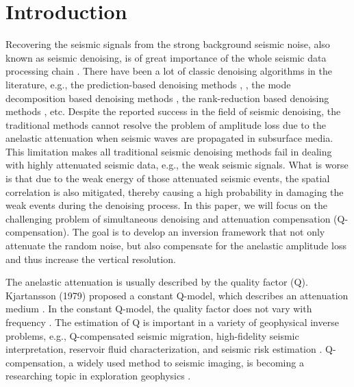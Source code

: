 \section{Introduction}
Recovering the seismic signals from the strong background seismic noise, also known as seismic denoising, is of great importance of the whole seismic data processing chain \cite{yanan2014,yanhui2016,amir2017ieee,li2018multidimensional,wang2019hankel}.  There have been a lot of classic denoising algorithms in the literature, e.g., the prediction-based denoising methods \cite{canales1984,abma1995}, , the mode decomposition based denoising methods \cite{chenwei2012}, the rank-reduction based denoising methods \cite{mssa,weilin2016dmssa,zhaoqiang2019tgrs}, etc. Despite the reported success in the field of seismic denoising, the traditional methods cannot resolve the problem of amplitude loss due to the anelastic attenuation when seismic waves are propagated in subsurface media.  This limitation makes all traditional seismic denoising methods fail in dealing with highly attenuated seismic data, e.g., the weak seismic signals. What is worse is that due to the weak energy of those attenuated seismic events, the spatial correlation is also mitigated, thereby causing a high probability in damaging the weak events during the denoising process.  In this paper, we will focus on the challenging problem of simultaneous denoising and attenuation compensation (Q-compensation). The goal is to develop an inversion framework that not only  attenuate the random noise, but also compensate for the anelastic amplitude loss and thus increase the vertical resolution.  

The anelastic attenuation is usually described by the quality factor (Q). Kjartansson (1979) \cite{kjartansson1979constant} proposed a constant Q-model, which describes an attenuation medium \cite{bickel1985plane,wang2002stable,shen2018q,shen2018q2}. In the constant Q-model, the quality factor does not vary with frequency \cite{braginsky1989quality,dai2012multi}. The estimation of Q is important in a variety of geophysical inverse problems, e.g., Q-compensated seismic migration, high-fidelity seismic interpretation, reservoir fluid characterization, and seismic risk estimation \cite{mousavi2014jgr,shank2018image,cheng2018q,jyothi2017seismic,luo2019q,chen2019multichannel}. Q-compensation, a widely used method to seismic imaging, is becoming a  researching topic in exploration geophysics \cite{guo2017adjoint,zhou2019viscoacoustic,aharchaou2019prestack}. 

